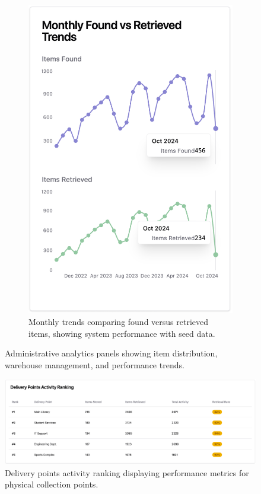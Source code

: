 \begin{figure}[h]
\begin{subfigure}[b]{0.32\textwidth}
        \includegraphics[width=\textwidth]{figs/appendix/web/2C.png}
        \caption{Monthly trends comparing found versus retrieved items, showing system performance with seed data.}
        \label{fig:web_monthly_trends}
    \end{subfigure}
    \caption{Administrative analytics panels showing item distribution, warehouse management, and performance trends.}
    \label{fig:web_analytics_panels}
\end{figure}

\begin{figure}[h]
    \centering
    \includegraphics[width=\textwidth]{figs/appendix/web/3.png}
    \caption{Delivery points activity ranking displaying performance metrics for physical collection points.}
    \label{fig:web_delivery_points}
\end{figure}

